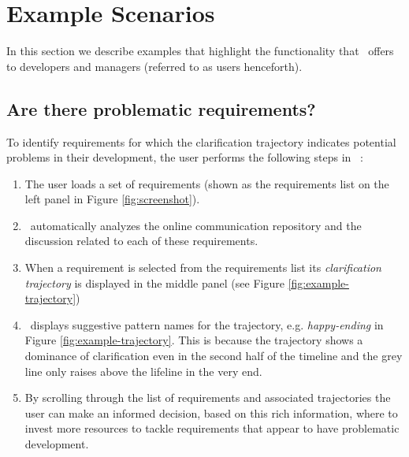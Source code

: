 \section{Example Scenarios}
In this section we describe examples that highlight the functionality that \viss\ offers to developers and managers (referred to as users henceforth).

\subsection{Are there problematic requirements?}
To identify requirements for which the clarification trajectory indicates potential problems in their development, the user performs the following steps in \viss\ :

\begin{enumerate}
\item The user loads a set of requirements (shown as the requirements list on the left panel in Figure \ref{fig:screenshot}).
\item \viss\ automatically analyzes the online communication repository and the discussion related to each of these requirements.  
\item When a requirement is selected from the requirements list its \emph{clarification trajectory} is displayed in the middle panel (see Figure \ref{fig:example-trajectory})
\item \viss\ displays suggestive pattern names for the trajectory, e.g. \emph{happy-ending} in Figure \ref{fig:example-trajectory}. This is because the trajectory shows a dominance of clarification even in the second half of the timeline and the grey line only raises above the lifeline in the very end.
\item By scrolling through the list of requirements and associated trajectories the user can make an informed decision, based on this rich information, where to invest more resources to tackle requirements that appear to have problematic development.
\end{enumerate}


